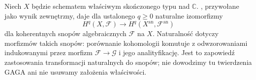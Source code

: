 \begin{przyklad}\label{cat:ex:gaga-natural}
Niech $X$ będzie schematem właściwym skończonego typu nad $\mathbb C$. , przywołane jako wynik zewnętrzny, daje dla ustalonego $q\ge0$ naturalne izomorfizmy
\[
H^q(X,\mathcal F)\longrightarrow H^q(X^{\mathrm{an}},\mathcal F^{\mathrm{an}})
\]
dla koherentnych snopów algebraicznych $\mathcal F$ na $X$. Naturalność dotyczy morfizmów takich snopów: porównanie kohomologii komutuje z odwzorowaniami indukowanymi przez morfizm $\mathcal F\to\mathcal G$ i jego analityfikację. Jest to zapowiedź zastosowania transformacji naturalnych do snopów; nie dowodzimy tu twierdzenia GAGA ani nie usuwamy założenia właściwości.
\end{przyklad}

